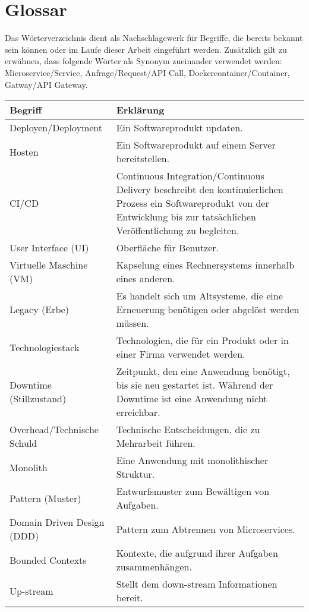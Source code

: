 \section{Glossar}

Das Wörterverzeichnis dient als Nachschlagewerk für Begriffe, die bereits bekannt sein können oder im Laufe dieser Arbeit eingeführt werden. Zusätzlich gilt zu erwähnen, dass folgende Wörter als Synonym zueinander verwendet werden: Microservice/Service, Anfrage/Request/API Call, Dockercontainer/Container, Gatway/API Gateway. 

\begin{longtable}{|l|p{10cm}|}
	Begriff & Erklärung \\ \hline
	Deployen/Deployment & Ein Softwareprodukt updaten.  \\ \hline
	Hosten & Ein Softwareprodukt auf einem Server bereitstellen. \\\hline
	CI/CD & Continuous Integration/Continuous Delivery beschreibt den kontinuierlichen Prozess ein Softwareprodukt von der Entwicklung bis zur tatsächlichen Veröffentlichung zu begleiten.\\\hline
	User Interface (UI)  & Oberfläche für Benutzer.  \\\hline
	Virtuelle Maschine (VM) & Kapselung eines Rechnersystems innerhalb eines anderen.  \\ \hline
	Legacy (Erbe) & Es handelt sich um Altsysteme, die eine Erneuerung benötigen oder abgelöst werden müssen. \\ \hline
	Technologiestack & Technologien, die für ein Produkt oder in einer Firma verwendet werden.  \\ \hline
	Downtime (Stillzustand) & Zeitpunkt, den eine Anwendung benötigt, bis sie neu gestartet ist. Während der Downtime ist eine Anwendung nicht erreichbar.  \\ \hline
	Overhead/Technische Schuld & Technische Entscheidungen, die zu Mehrarbeit führen. \\ \hline
	Monolith & Eine Anwendung mit monolithischer Struktur. \\ \hline
	Pattern (Muster) & Entwurfsmuster zum Bewältigen von Aufgaben.\\ \hline
	Domain Driven Design (DDD) & Pattern zum Abtrennen von Microservices.\\ \hline
	Bounded Contexts & Kontexte, die aufgrund ihrer Aufgaben zusammenhängen. \\ \hline
	Up-stream & Stellt dem down-stream Informationen bereit. \\ \hline

\end{longtable}

